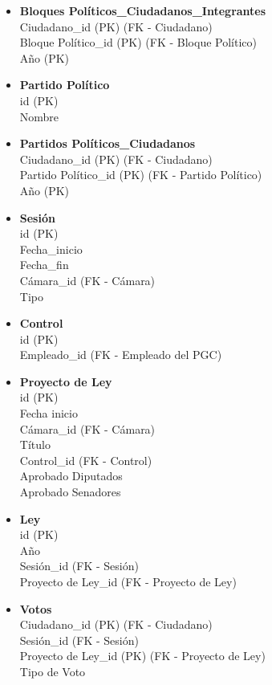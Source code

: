 \begin{itemize}
	\item \textbf{Bloques Políticos\_Ciudadanos\_Integrantes} \\
	Ciudadano\_id (PK) (FK - Ciudadano) \\
	Bloque Político\_id (PK) (FK - Bloque Político)\\
	Año (PK)
	
	\item \textbf{Partido Político} \\
	id (PK) \\
	Nombre 
	
	\item \textbf{Partidos Políticos\_Ciudadanos} \\
	Ciudadano\_id (PK) (FK - Ciudadano) \\
	Partido Político\_id (PK) (FK - Partido Político)\\
	Año (PK)
	
	\item \textbf{Sesión} \\
	id (PK) \\
	Fecha\_inicio \\
	Fecha\_fin \\
	Cámara\_id (FK - Cámara) \\
	Tipo
	
	\item \textbf{Control} \\
	id (PK) \\
	Empleado\_id (FK - Empleado del PGC)
	
	\item \textbf{Proyecto de Ley} \\
	id (PK) \\
	Fecha inicio \\
	Cámara\_id (FK - Cámara) \\ 
	Título \\
	Control\_id (FK - Control) \\
	Aprobado Diputados \\
	Aprobado Senadores
	
	\item \textbf{Ley} \\
	id (PK) \\
	Año \\
	Sesión\_id (FK - Sesión) \\
	Proyecto de Ley\_id (FK - Proyecto de Ley)
	
	\item \textbf{Votos} \\
	Ciudadano\_id (PK) (FK - Ciudadano) \\
	Sesión\_id  (FK - Sesión) \\
	Proyecto de Ley\_id (PK) (FK - Proyecto de Ley) \\
	Tipo de Voto
	

\end{itemize}
